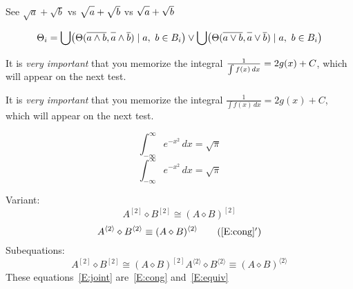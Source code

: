 \documentclass{amsart}
\begin{document}
See $\sqrt a + \sqrt b$ vs $\sqrt{\mathstrut a} + \sqrt{\mathstrut b}$ vs $\sqrt{\vphantom ba} + \sqrt b$

\[
    \Theta_i = \bigcup \bigl(\Theta(\overline{a \wedge b},
                                \overline{\vphantom ba} \wedge \overline b) \mid
                            a,\ b \in B_i \bigr)
                    \vee \bigcup \bigr( \Theta(\overline{a \vee b},
                                \overline{\vphantom ba} \vee \overline b) \mid
                            a,\ b \in B_i \bigr)
\]

    It is \emph{very important} that you memorize the integral
    $\smash{\frac1{\int f(x)\,dx}} = 2g(x) + C$,
    which will appear on the next test.

    It is \emph{very important} that you memorize the integral
    $\frac1{\int f(x)\,dx} = 2g(x) + C$,
    which will appear on the next test.

\[
    \int_{-\infty}^\infty e^{-x^2}\,dx = \sqrt\pi\tag{Int}
\]
\[
    \int_{-\infty}^\infty e^{-x^2}\,dx = \sqrt\pi\tag*{A--B}
\]

Variant:
\begin{equation}
    A^{[2]} \diamond B^{[2]} \cong
    (A \diamond B)^{[2]}\label{E:cong}
\end{equation}
\begin{equation}
    A^{\langle 2 \rangle} \diamond B^{\langle 2 \rangle}
    \equiv (A \diamond B)^{\langle 2 \rangle}\tag{\ref{E:cong}$'$}
\end{equation}
Subequations:
\begin{subequations}\label{E:joint}
    \begin{equation}
        A^{[2]} \diamond B^{[2]} \cong
        (A \diamond B)^{[2]}\label{E:cong}
    \end{equation}
    \begin{equation}
        A^{\langle 2 \rangle} \diamond B^{\langle 2 \rangle}
        \equiv (A \diamond B)^{\langle 2 \rangle}\label{E:equiv}
    \end{equation}
\end{subequations}
These equations~\eqref{E:joint} are~\eqref{E:cong} and~\eqref{E:equiv}
\end{document}
